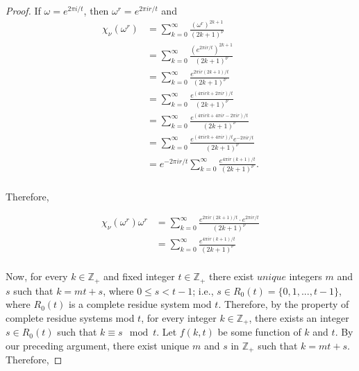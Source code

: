 \documentclass[../article.tex]{subfiles}
\begin{document}
\begin{proof}
If $\omega = e^{2\pi i/t}$, then $\omega^r = e^{2 \pi i r/t}$ and
\begin{equation}
\begin{split}
\chi_{\nu}(\omega^{r}) &= \sum_{k=0}^{\infty} \frac{(\omega^r)^{2k+1}}{(2k+1)^{\nu}} \\
&= \sum_{k=0}^{\infty} \frac{(e^{2 \pi i r/t})^{2k+1}}{(2k+1)^{\nu}} \\
&= \sum_{k=0}^{\infty} \frac{e^{2 \pi i r(2k+1)/t}}{(2k+1)^{\nu}} \\
&= \sum_{k=0}^{\infty} \frac{e^{(4 \pi irk +2\pi i r)/t}}{(2k+1)^{\nu}} \\
&= \sum_{k=0}^{\infty} \frac{e^{(4 \pi irk +4 \pi ir - 2\pi i r)/t}}{(2k+1)^{\nu}} \\
&= \sum_{k=0}^{\infty} \frac{e^{(4 \pi irk +4 \pi ir)/t}e^{- 2\pi i r/t}}{(2k+1)^{\nu}} \\
&= e^{- 2\pi i r/t} \sum_{k=0}^{\infty} \frac{e^{4 \pi i r(k+1)/t}}{(2k+1)^{\nu}}. \\
\end{split}
\end{equation}

Therefore,

\begin{equation}
\begin{split}
\chi_{\nu}(\omega^r)\omega^r &= \sum_{k=0}^{\infty} \frac{e^{2 \pi i r(2k+1)/t} \cdot e^{2 \pi i r/t}}{(2k+1)^{\nu}} \\
&= \sum_{k=0}^{\infty} \frac{e^{4 \pi i r(k+1)/t}}{(2k+1)^{\nu}} \\
\end{split}
\end{equation}

Now, for every $k \in \mathbb{Z}_{+}$ and fixed integer $t \in \mathbb{Z}_{+}$ there exist $unique$ integers $m$ and $s$ such that $k = mt +s$, where $0 \leq s < t-1$; i.e., $s \in R_{0}(t) = \{0, 1, ..., t-1\}$, where $R_{0}(t)$ is a complete residue system mod $t$. Therefore, by the property of complete residue systems mod $t$, for every integer $k \in \mathbb{Z}_{+}$, there exists an integer $s \in R_{0}(t)$ such that $k \equiv s \mod t$. Let $f(k,t)$ be some function of $k$ and $t$. By our preceding argument, there exist unique $m$ and $s$ in $\mathbb{Z}_{+}$ such that $k = mt +s$. Therefore,


\end{proof}
\end{document}
